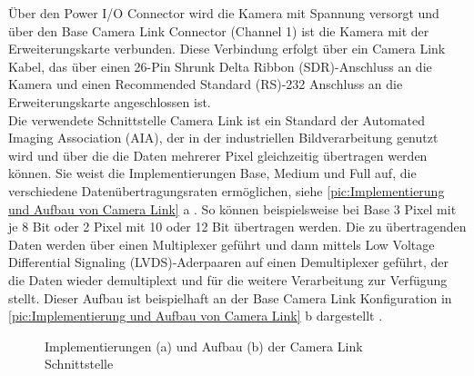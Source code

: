 \documentclass[ngerman,12pt]{article} %
\begin{document}
{Über den Power I/O Connector wird die Kamera mit Spannung versorgt und über den Base Camera Link Connector (Channel 1) ist die Kamera mit der Erweiterungskarte verbunden. Diese Verbindung erfolgt über ein Camera Link Kabel, das über einen 26-Pin Shrunk Delta Ribbon (SDR)-Anschluss an die Kamera und einen Recommended Standard (RS)-232 Anschluss an die Erweiterungskarte angeschlossen ist.\\
Die verwendete Schnittstelle Camera Link ist ein Standard der Automated Imaging Association (AIA), der in der industriellen Bildverarbeitung genutzt wird und über die die Daten mehrerer Pixel gleichzeitig übertragen werden können. Sie weist die Implementierungen Base, Medium und Full auf, die verschiedene Datenübertragungsraten ermöglichen, siehe \autoref{pic:Implementierung und Aufbau von Camera Link} a \cite{Stemmer a}. So können beispielsweise bei Base 3 Pixel mit je 8 Bit oder 2 Pixel mit 10 oder 12 Bit übertragen werden. Die zu übertragenden Daten werden über einen Multiplexer geführt und dann mittels Low Voltage Differential Signaling (LVDS)-Aderpaaren auf einen Demultiplexer geführt, der die Daten wieder demultiplext und für die weitere Verarbeitung zur Verfügung stellt. Dieser Aufbau ist beispielhaft an der Base Camera Link Konfiguration in \autoref{pic:Implementierung und Aufbau von Camera Link} b dargestellt \cite{Wikipedia a}.

\begin{figure}[h!tb]
  \centering
  \qquad
  \caption[Implementierungen und Aufbau von Camera Link ]{\label{pic:Implementierung und Aufbau von Camera Link} Implementierungen (a) \cite{Stemmer a} und Aufbau (b)  \cite{Wikipedia a} der Camera Link Schnittstelle}
\end{figure}

}
\end{document}
